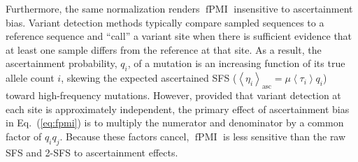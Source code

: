 \documentclass[11pt, letterpaper]{article}   	%
\newcommand{\eq}[1]{Eq.~(\ref{#1})}
\newcommand{\Eq}[1]{Equation~(\ref{#1})}
\newcommand{\E}[1]{\left< #1 \right>}
\DeclareMathOperator{\pmi}{PMI}
\DeclareMathOperator{\fpmi}{fPMI}
\begin{document}
Furthermore, the same normalization renders $\fpmi$ insensitive to ascertainment bias.
Variant detection methods typically compare sampled sequences to a reference sequence and ``call'' a variant site when there is sufficient evidence that at least one sample differs from the reference at that site.
As a result, the ascertainment probability, $q_i$, of a mutation is an increasing function of its true allele count $i$, skewing the expected ascertained SFS ($\E{\eta_i}_{\text{asc}} = \mu \E{\tau_i} q_i$) toward high-frequency mutations.
However, provided that variant detection at each site is approximately independent, the primary effect of ascertainment bias in \eq{eq:fpmi} is to multiply the numerator and denominator by a common factor of $q_i q_j$.
Because these factors cancel, $\fpmi$ is less sensitive than the raw SFS and 2-SFS to ascertainment effects.

\end{document}
